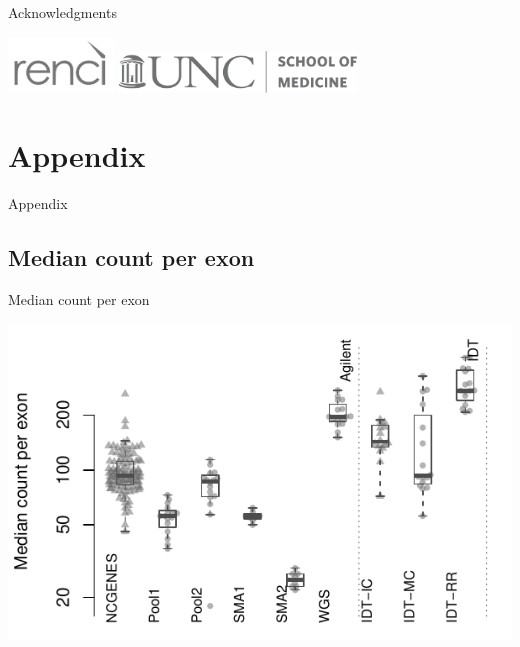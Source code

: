 \documentclass[
  10pt,
  ignorenonframetext,
  m]{beamer}
\begin{document}
\begin{frame}{Acknowledgments}
\bigskip

\centering

\includegraphics[height=4em]{images/renci-logo_grey.pdf} \hspace{2ex}
\includegraphics[height=3em]{images/SOM_gray.pdf}

\appendix

\end{frame}

\hypertarget{appendix}{%
\section*{Appendix}\label{appendix}}

\begin{frame}{Appendix}
\protect\hypertarget{appendix-1}{}

\label{apptoc}

\tableofcontents

\end{frame}

\hypertarget{median-count-per-exon}{%
\subsection{Median count per exon}\label{median-count-per-exon}}

\begin{frame}{Median count per exon}

\begin{center}\includegraphics{defense_files/figure-beamer/medIntMolCount-1} \end{center}

\end{frame}
\end{document}
